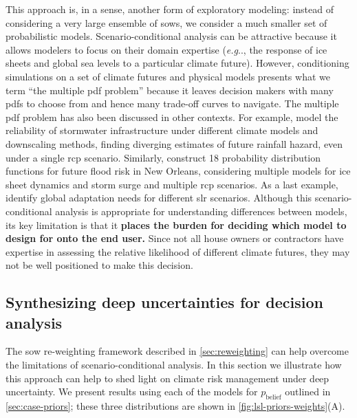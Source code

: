 \documentclass{agujournal2019}
\makeatletter
\DeclareRobustCommand\onedot{\futurelet\@let@token\@onedot}
\def\@onedot{\ifx\@let@token.\else.\null\fi\xspace}
\def\eg{\emph{e.g}\onedot} \def\Eg{\emph{E.g}\onedot}
\makeatother
\begin{document}
This approach is, in a sense, another form of exploratory modeling: instead of considering a very large ensemble of \glspl{sow}, we consider a much smaller set of probabilistic models.
Scenario-conditional analysis can be attractive because it allows modelers to focus on their domain expertise (\eg, the response of ice sheets and global sea levels to a particular climate future).
However, conditioning simulations on a set of climate futures and physical models presents what we term ``the multiple \gls{pdf} problem'' because it leaves decision makers with many \glspl{pdf} to choose from and hence many trade-off curves to navigate.
The multiple \gls{pdf} problem has also been discussed in other contexts.
For example,  model the reliability of stormwater infrastructure under different climate models and downscaling methods, finding diverging estimates of future rainfall hazard, even under a single \gls{rcp} scenario.
Similarly,  construct 18 probability distribution functions for future flood risk in New Orleans, considering multiple models for ice sheet dynamics and storm surge and multiple \gls{rcp} scenarios. As a last example,  identify global adaptation needs for different \gls{slr} scenarios.
Although this scenario-conditional analysis is appropriate for understanding differences between models, its key limitation is that it \textbf{places the burden for deciding which model to design for onto the end user.}
Since not all house owners or contractors have expertise in assessing the relative likelihood of different climate futures, they may not be well positioned to make this decision.

\subsection{Synthesizing deep uncertainties for decision analysis}\label{sec:results-synthesis}

The \gls{sow} re-weighting framework described in \cref{sec:reweighting} can help overcome the limitations of scenario-conditional analysis.
In this section we illustrate how this approach can help to shed light on climate risk management under deep uncertainty.
We present results using each of the models for $p_\mathrm{belief}$ outlined in \cref{sec:case-priors}; these three distributions are shown in \cref{fig:lsl-priors-weights}(A).
\end{document}
